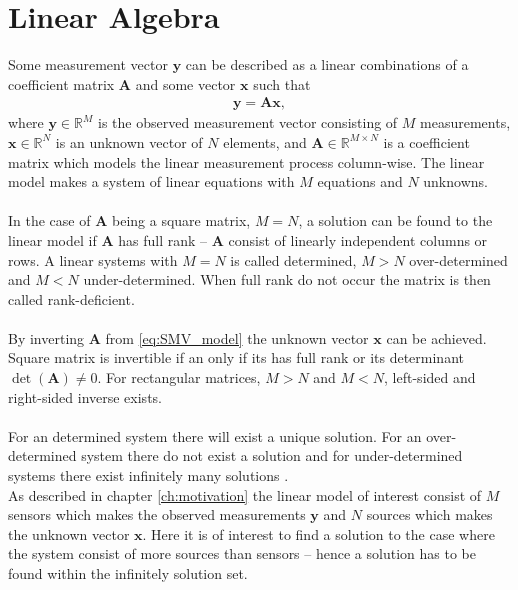 \section{Linear Algebra}
Some measurement vector $\mathbf{y}$ can be described as a linear combinations of a coefficient matrix $\mathbf{A}$ and some vector $\mathbf{x}$ such that
\begin{align}\label{eq:SMV_model}
\mathbf{y} = \mathbf{Ax},
\end{align}
where $\mathbf{y} \in \mathbb{R}^M$ is the observed measurement vector consisting of $M$ measurements, $\mathbf{x} \in \mathbb{R}^N$ is an unknown vector of $N$ elements, and $\mathbf{A} \in \mathbb{R}^{M \times N}$ is a coefficient matrix which models the linear measurement process column-wise. 
The linear model makes a system of linear equations with $M$ equations and $N$ unknowns.
\\ \\
In the case of $\mathbf{A}$ being a square matrix, $M = N$, a solution can be found to the linear model if $\mathbf{A}$ has full rank -- $\mathbf{A}$ consist of linearly independent columns or rows.
A linear systems with $M = N$ is called determined, $M > N$ over-determined and $M < N$ under-determined. 
When full rank do not occur the matrix is then called rank-deficient.
\\ \\
By inverting $\mathbf{A}$ from \eqref{eq:SMV_model} the unknown vector $\mathbf{x}$ can be achieved. 
Square matrix is invertible if an only if its has full rank or its determinant $\det(\mathbf{A}) \neq 0$. 
For rectangular matrices, $M > N$ and $M < N$, left-sided and right-sided inverse exists.
\\ \\
For an determined system there will exist a unique solution.
For an over-determined system there do not exist a solution and for under-determined systems there exist infinitely many solutions \cite[p. ix]{CS}.
\\ 
As described in chapter \ref{ch:motivation} the linear model of interest consist of $M$ sensors which makes the observed measurements $\textbf{y}$ and $N$ sources which makes the unknown vector $\textbf{x}$. 
Here it is of interest to find a solution to the case where the system consist of more sources than sensors -- hence a solution has to be found within the infinitely solution set.

